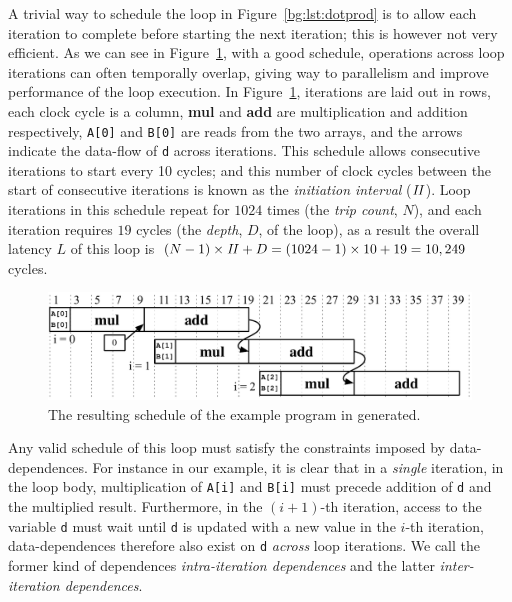 A trivial way to schedule the loop in Figure~\ref{bg:lst:dotprod} is to allow
each iteration to complete before starting the next iteration; this is however
not very efficient.  As we can see in Figure~\ref{bg:fig:schedule}, with a
good schedule, operations across loop iterations can often temporally overlap,
giving way to parallelism and improve performance of the loop execution.  In
Figure~\ref{bg:fig:schedule}, iterations are laid out in rows, each clock cycle
is a column, \textbf{mul} and \textbf{add} are multiplication and addition
respectively, \verb|A[0]| and \verb|B[0]| are reads from the two arrays, and
the arrows indicate the data-flow of \verb|d| across iterations.  This schedule
allows consecutive iterations to start every 10 cycles; and this number of
clock cycles between the start of consecutive iterations is known as the
\emph{initiation interval} ($\mathit{II}$).  Loop iterations in this schedule repeat
for $1024$ times (the \emph{trip count}, $N$), and each iteration requires $19$
cycles (the \emph{depth}, $D$, of the loop), as a result the overall latency
$L$ of this loop is $(N - 1) \times \mathit{II} + D = (1024 - 1) \times 10 + 19 =
10,249$ cycles.
\begin{figure}[ht]
    \centering
    \includegraphics[width=0.8\linewidth]{bg/fig/schedule}
    \caption{%
        The resulting schedule of the example program in generated.
    }\label{bg:fig:schedule}
\end{figure}

Any valid schedule of this loop must satisfy the constraints imposed by
data-dependences.  For instance in our example, it is clear that in a
\emph{single} iteration, in the loop body, multiplication of \verb|A[i]|
and \verb|B[i]| must precede addition of \verb|d| and the multiplied
result.  Furthermore, in the $(i + 1)$-th iteration, access to the variable
\verb|d| must wait until \verb|d| is updated with a new value in the $i$-th
iteration, data-dependences therefore also exist on \verb|d| \emph{across}
loop iterations.  We call the former kind of dependences \emph{intra-iteration
dependences} and the latter \emph{inter-iteration dependences}.

